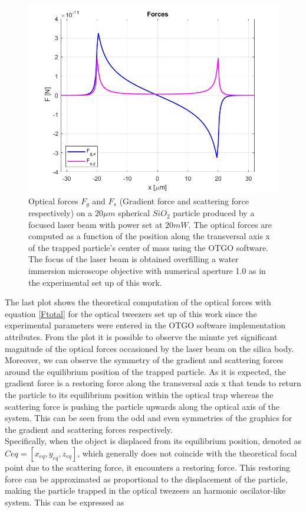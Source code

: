 \documentclass[letterpaper,12pt,oneside]{book}
\begin{document}
\begin{figure}[H]
    \centering
    \includegraphics[scale=0.4]{OTGO/Plotremichido 2.png}
    \caption{Optical forces $F_g$ and $F_s$ (Gradient force and scattering force respectively) on a $20 \mu m$ spherical $SiO_2$ particle produced by a focused laser beam with power set at $20 mW$. The optical forces are computed as a function of the position along the transversal axis x of the trapped particle's center of mass using the OTGO software. The focus of the laser beam is obtained overfilling a water immersion microscope objective with numerical aperture 1.0 as in the experimental set up of this work.}
    \label{forcesOTGOR}
\end{figure} 
The last plot shows the theoretical computation of the optical forces with equation \eqref{Ftotal} for the optical tweezers set up of this work since the experimental parameters were entered in the OTGO software implementation attributes. From the plot it is possible to observe the minute yet significant magnitude of the optical forces occasioned by the laser beam on the silica body. Moreover, we can observe the symmetry of the gradient and scattering forces around the equilibrium position of the trapped particle. As it is expected, the gradient force is a restoring force along the transversal axis x that tends to return the particle to its equilibrium position within the optical trap whereas the scattering force is pushing the particle upwards along the optical axis of the system. This can be seen from the odd and even symmetries of the graphics for the gradient and scattering forces respectively. 
\\Specifically, when the object is displaced from its equilibrium position, denoted as $Ceq = [x_{eq}, y_{eq}, z_{eq}]$, which generally does not coincide with the theoretical focal point due to the scattering force, it encounters a restoring force. This restoring force can be approximated as proportional to the displacement of the particle, making the particle trapped in the optical twezeers an harmonic oscilator-like system.  This can be expressed as 
\end{document}
